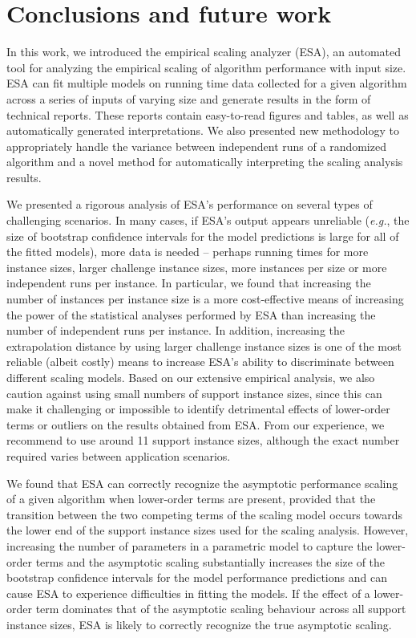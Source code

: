 \documentclass[aic]{iosart2x}
\newcommand{\eg}{\emph{e.g.}}
\begin{document}
\section{Conclusions and future work}
\label{sec:Conclusion}

In this work, we introduced the empirical scaling analyzer (ESA), an automated tool for analyzing the empirical scaling of algorithm performance with input size. 
ESA can fit multiple models on running time data collected for a given algorithm across a series of inputs of varying size and generate results in the form of technical reports. 
These reports contain easy-to-read figures and tables, as well as automatically generated interpretations. 
We also presented new methodology to appropriately handle the variance between independent runs of a randomized algorithm and a novel method for automatically interpreting the scaling analysis results.  

We presented a rigorous analysis of ESA's performance on several types of challenging scenarios. 
In many cases, if ESA's output appears unreliable (\eg{}, the size of bootstrap confidence intervals for the model predictions is large for all of the fitted models), more data is needed -- perhaps running times for more instance sizes, larger challenge instance sizes, more instances per size or more independent runs per instance. 
In particular, we found that increasing the number of instances per instance size is a more cost-effective means of increasing the power of the statistical analyses performed by ESA than increasing the number of independent runs per instance. 
In addition, increasing the extrapolation distance by using larger challenge instance sizes is one of the most reliable (albeit costly) means to increase ESA's ability to discriminate between different scaling models. 
Based on our extensive empirical analysis, we also caution against using small numbers of support instance sizes, since this can make it challenging or impossible to identify detrimental effects of lower-order terms or outliers on the results obtained from ESA.
From our experience, we recommend to use around 11 support instance sizes, although the exact number required varies between application scenarios. 

We found that ESA can correctly recognize the asymptotic performance scaling of a given algorithm when lower-order terms are present, provided that the transition between the two competing terms of the scaling model occurs towards the lower end of the support instance sizes used for the scaling analysis. 
However, increasing the number of parameters in a parametric model to capture the lower-order terms and the asymptotic scaling substantially increases the size of the bootstrap confidence intervals for the model performance predictions and can cause ESA to experience difficulties in fitting the models. 
If the effect of a lower-order term dominates that of the asymptotic scaling behaviour across all support instance sizes, ESA is likely to correctly recognize the true asymptotic scaling.
\end{document}

